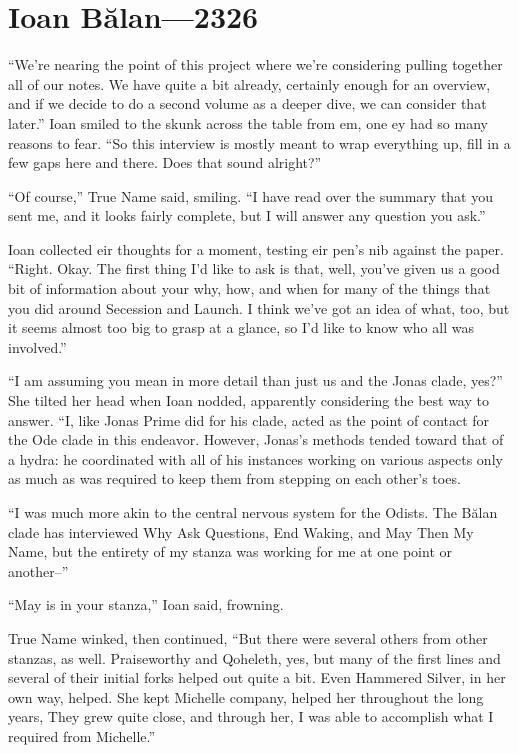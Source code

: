 \hypertarget{ioan-bux103lan-2326}{%
\chapter{Ioan Bălan---2326}\label{ioan-bux103lan-2326}}

``We're nearing the point of this project where we're considering pulling together all of our notes. We have quite a bit already, certainly enough for an overview, and if we decide to do a second volume as a deeper dive, we can consider that later.'' Ioan smiled to the skunk across the table from em, one ey had so many reasons to fear. ``So this interview is mostly meant to wrap everything up, fill in a few gaps here and there. Does that sound alright?''

``Of course,'' True Name said, smiling. ``I have read over the summary that you sent me, and it looks fairly complete, but I will answer any question you ask.''

Ioan collected eir thoughts for a moment, testing eir pen's nib against the paper. ``Right. Okay. The first thing I'd like to ask is that, well, you've given us a good bit of information about your why, how, and when for many of the things that you did around Secession and Launch. I think we've got an idea of what, too, but it seems almost too big to grasp at a glance, so I'd like to know who all was involved.''

``I am assuming you mean in more detail than just us and the Jonas clade, yes?'' She tilted her head when Ioan nodded, apparently considering the best way to answer. ``I, like Jonas Prime did for his clade, acted as the point of contact for the Ode clade in this endeavor. However, Jonas's methods tended toward that of a hydra: he coordinated with all of his instances working on various aspects only as much as was required to keep them from stepping on each other's toes.

``I was much more akin to the central nervous system for the Odists. The Bălan clade has interviewed Why Ask Questions, End Waking, and May Then My Name, but the entirety of my stanza was working for me at one point or another--''

``May is in your stanza,'' Ioan said, frowning.

True Name winked, then continued, ``But there were several others from other stanzas, as well. Praiseworthy and Qoheleth, yes, but many of the first lines and several of their initial forks helped out quite a bit. Even Hammered Silver, in her own way, helped. She kept Michelle company, helped her throughout the long years, They grew quite close, and through her, I was able to accomplish what I required from Michelle.''

